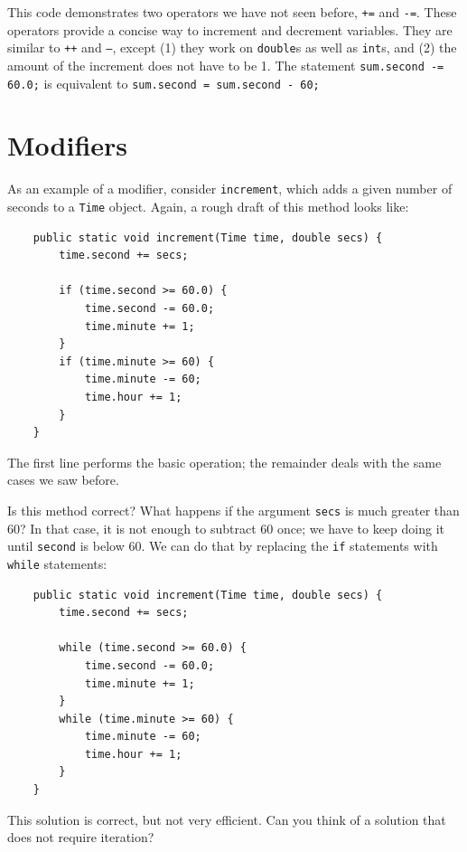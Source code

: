\documentclass[12pt]{book}
\theoremstyle{exercise}
\begin{document}

This code demonstrates two operators we have not seen before,
{\tt +=} and {\tt -=}.  These operators provide a concise
way to increment and decrement variables.  They are similar
to {\tt ++} and {\tt --}, except (1) they work on {\tt double}s
as well as {\tt int}s, and (2) the amount of the increment
does not have to be 1.  The statement {\tt sum.second -= 60.0;}
is equivalent to {\tt sum.second = sum.second - 60;}


\section{Modifiers}

As an example of a modifier, consider {\tt increment},
which adds a given number of seconds to a {\tt Time} object.
Again, a rough draft of this method looks like:

\begin{lstlisting}
    public static void increment(Time time, double secs) {
        time.second += secs;

        if (time.second >= 60.0) {
            time.second -= 60.0;
            time.minute += 1;
        }
        if (time.minute >= 60) {
            time.minute -= 60;
            time.hour += 1;
        }
    }
\end{lstlisting}
%
The first line performs the basic operation; the remainder
deals with the same cases we saw before.

Is this method correct?  What happens if the argument {\tt secs}
is much greater than 60?  In that case, it is not enough to
subtract 60 once; we have to keep doing it until {\tt second}
is below 60.  We can do that by replacing the {\tt if}
statements with {\tt while} statements:

\begin{lstlisting}
    public static void increment(Time time, double secs) {
        time.second += secs;

        while (time.second >= 60.0) {
            time.second -= 60.0;
            time.minute += 1;
        }
        while (time.minute >= 60) {
            time.minute -= 60;
            time.hour += 1;
        }
    }
\end{lstlisting}
%
This solution is correct, but not very efficient.
Can you think of a solution that does not require iteration?
\end{document}
